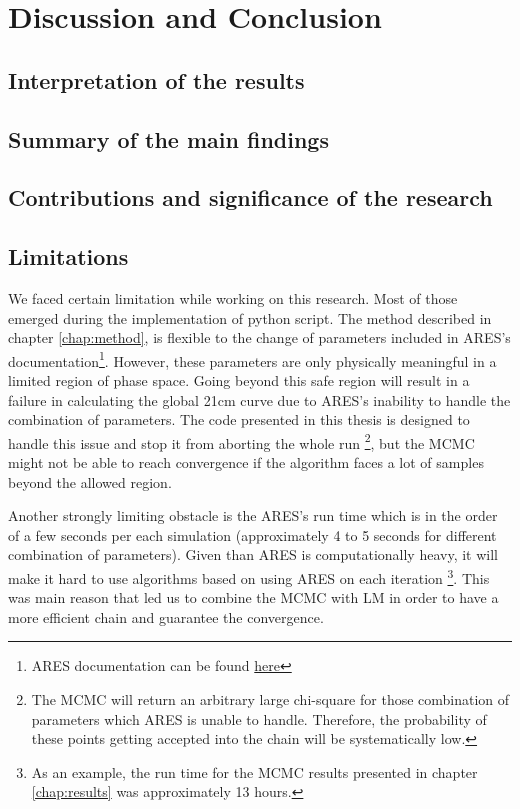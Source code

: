 \documentclass[12pt, TexShade, letterpaper]{report}
\begin{document}
\chapter{Discussion and Conclusion}
\label{chap:discussion}
\section{Interpretation of the results}
\section{Summary of the main findings}
\section{Contributions and significance of the research}
\section{Limitations}
We faced certain limitation while working on this research. Most of those emerged during the implementation of python script. 
The method described in chapter \ref{chap:method}, is flexible to the change of parameters included in ARES's documentation\footnote{ARES documentation can be found \hyperlink{https://ares.readthedocs.io/en/latest/}{here}}. However, these parameters are only physically meaningful in a limited region of phase space. Going beyond this safe region will result in a failure in calculating the global 21cm curve due to ARES's inability to handle the combination of parameters. The code presented in this thesis is designed to handle this issue and stop it from aborting the whole run \footnote{The MCMC will return an arbitrary large chi-square for those combination of parameters which ARES is unable to handle. Therefore, the probability of these points getting accepted into the chain will be systematically low.}, but the MCMC might not be able to reach convergence if the algorithm faces a lot of samples beyond the allowed region.\par
Another strongly limiting obstacle is the ARES's run time which is in the order of a few seconds per each simulation (approximately 4 to 5 seconds for different combination of parameters). Given than ARES is computationally heavy, it will make it hard to use algorithms based on using ARES on each iteration \footnote{ As an example, the run time for the MCMC results presented in chapter \ref{chap:results} was approximately 13 hours.}. This was main reason that led us to combine the MCMC with LM in order to have a more efficient chain and guarantee the convergence.\par 
\end{document}
